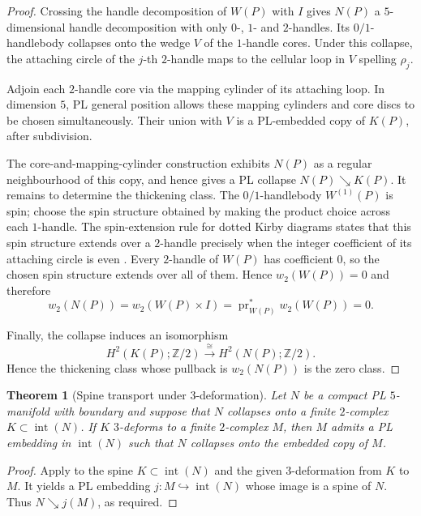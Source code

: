 \documentclass[a4paper,11pt,reqno]{amsart}
\newtheorem{theorem}{Theorem}
\theoremstyle{definition}
\theoremstyle{remark}
\begin{document}
	\begin{proof}
		Crossing the handle decomposition of $W(P)$ with $I$ gives
		$N(P)$ a $5$-dimensional handle decomposition with only
		$0$-, $1$- and $2$-handles. Its $0/1$-handlebody collapses
		onto the wedge $V$ of the $1$-handle cores. Under this collapse,
		the attaching circle of the $j$-th $2$-handle maps to the
		cellular loop in $V$ spelling $\rho_j$.
		
		Adjoin each $2$-handle core via the mapping cylinder of its attaching loop. 
		In dimension $5$, PL general position allows
		these mapping cylinders and core discs to be chosen simultaneously.
		Their union with $V$ is a PL-embedded copy of $K(P)$, after
		subdivision. 
		
		The core-and-mapping-cylinder construction exhibits
		$N(P)$ as a regular neighbourhood of this copy, and hence gives a
		PL collapse
		\(
		N(P)\searrow K(P).
		\)
		It remains to determine the thickening class. The $0/1$-handlebody
		$W^{(1)}(P)$ is spin; choose the spin structure obtained by making
		the product choice across each $1$-handle. The spin-extension rule
		for dotted Kirby diagrams states that this spin structure extends
		over a $2$-handle precisely when the integer coefficient of its
		attaching circle is even
		\cite[\S 5.7]{GompfStipsicz}. Every $2$-handle of $W(P)$ has
		coefficient $0$, so the chosen spin structure extends over all of
		them. Hence
		\(
		w_2(W(P))=0
		\)
		and therefore
		\[
		w_2(N(P))
		=
		w_2(W(P)\times I)
		=
		\operatorname{pr}_{W(P)}^*w_2(W(P))
		=
		0.
		\]
		
		Finally, the collapse induces an isomorphism
		\[
		H^2(K(P);\mathbb Z/2)
		\xrightarrow{\;\cong\;}
		H^2(N(P);\mathbb Z/2).
		\]
		Hence the thickening class whose pullback is $w_2(N(P))$ is the
		zero class.
	\end{proof}
	
	\begin{theorem}[Spine transport under $3$-deformation]
		\label{thm:spine-transport}
		Let $N$ be a compact PL $5$-manifold with boundary and suppose that $N$
		collapses onto a finite $2$-complex
		$K\subset\operatorname{int}(N)$. If $K$ $3$-deforms to a finite
		$2$-complex $M$, then $M$ admits a PL embedding in
		$\operatorname{int}(N)$ such that $N$ collapses onto the embedded copy of
		$M$.
	\end{theorem}
	
	\begin{proof}
		Apply \cite[\S~2.1, Fact~(2)]{FKL} to the spine $K\subset\operatorname{int}(N)$ and the given 3-deformation from $K$ to $M$. It yields a PL embedding $j\colon M\hookrightarrow\operatorname{int}(N)$ whose image is a spine of $N$. Thus $N\searrow j(M)$, as required. 
	\end{proof}
	
\end{document}
